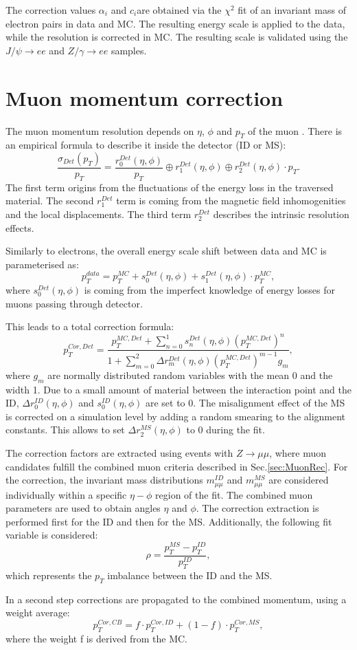 The correction values $\alpha_i$ and $c_i$are obtained via the $\chi^2$ fit of an invariant mass of electron pairs in data and MC. The resulting energy scale is applied to the data, while the resolution is corrected in MC. The resulting scale is validated using the $J/\psi \to ee$ and $Z/\gamma \to ee $ samples.

\section{Muon momentum correction}\label{sec:MuonMomCor}
The muon momentum resolution depends on $\eta$, $\phi$ and $p_T$ of the muon \cite{AtlasExperiment}. There is an empirical formula to describe it inside the detector (ID or MS):
\begin{equation}\label{eq:MuonResolution}
\frac{\sigma_{Det}(p_T)}{p_T}=\frac{r^{Det}_0(\eta, \phi)}{p_T} \oplus r^{Det}_1 (\eta, \phi)  \oplus r^{Det}_2(\eta, \phi) \cdot p_T.
\end{equation}
The first term origins from the fluctuations of the energy loss in the traversed material. The second $r^{Det}_1$ term is coming from the magnetic field inhomogenities and the local displacements. The third term $r^{Det}_2$ describes the intrinsic resolution effects. 

Similarly to electrons, the overall energy scale shift between data and MC is parameterised as:
\begin{equation}
p_T^{data}=p_T^{MC}+s_0^{Det}(\eta, \phi)+s_1^{Det}(\eta, \phi) \cdot p_T^{MC},
\end{equation}
where $s_0^{Det}(\eta, \phi)$ is coming from the imperfect knowledge of energy losses for muons passing through detector. 

This leads to a total correction formula:
\begin{equation}
p^{Cor,Det}_T=\frac{p_{T}^{MC,Det}+\sum\limits_{n=0}^1 s_n^{Det}(\eta, \phi)(p_T^{MC,Det})^n}{1+\sum\limits_{m=0}^2 \Delta r_m^{Det}(\eta, \phi)(p_T^{MC,Det})^{m-1} g_m},
\end{equation}
where $g_m$ are normally distributed random variables with the mean 0 and the width 1. Due to a small amount of material between the interaction point and the ID, $\Delta r^{ID}_0(\eta, \phi)$ and $s_0^{ID}(\eta, \phi)$ are set to 0. The misalignment effect of the MS is corrected on a simulation level by adding a random smearing to the alignment constants. This allows to set $\Delta r^{MS}_2(\eta, \phi)$ to 0 during the fit. 

The correction factors are extracted using events with $Z \to \mu \mu$, where muon candidates fulfill the combined muon criteria described in Sec.\ref{sec:MuonRec}. For the correction, the invariant mass distributions $m_{\mu\mu}^{ID}$ and $m_{\mu\mu}^{MS}$ are considered individually within a specific $\eta - \phi$ region of the fit. The combined muon parameters are used to obtain angles $\eta$ and $\phi$. 
The correction extraction is performed first for the ID and then for the MS. Additionally, the following fit variable is considered:
\begin{equation}
\rho = \frac{p_T^{MS}-p_T^{ID}}{p_T^{ID}},
\end{equation}
which represents the $p_T$ imbalance between the ID and the MS. 

In a second step corrections are propagated to the combined momentum, using a weight average:
\begin{equation}
p_T^{Cor,CB}= f\cdot p_T^{Cor,ID}+(1-f) \cdot p_T^{Cor,MS},
\end{equation}
where the weight f is derived from the MC. 
